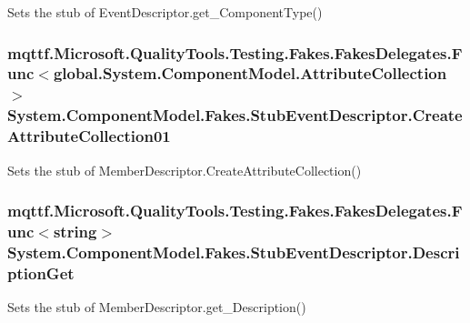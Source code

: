 Sets the stub of Event\-Descriptor.\-get\-\_\-\-Component\-Type()

\hypertarget{class_system_1_1_component_model_1_1_fakes_1_1_stub_event_descriptor_a0048f09bfeffd178c07e0e381c66b325}{
\subsubsection[{Create\-Attribute\-Collection01}]{\setlength{\rightskip}{0pt plus 5cm}mqttf.\-Microsoft.\-Quality\-Tools.\-Testing.\-Fakes.\-Fakes\-Delegates.\-Func$<$global.\-System.\-Component\-Model.\-Attribute\-Collection$>$ System.\-Component\-Model.\-Fakes.\-Stub\-Event\-Descriptor.\-Create\-Attribute\-Collection01}}\label{class_system_1_1_component_model_1_1_fakes_1_1_stub_event_descriptor_a0048f09bfeffd178c07e0e381c66b325}


Sets the stub of Member\-Descriptor.\-Create\-Attribute\-Collection()

\hypertarget{class_system_1_1_component_model_1_1_fakes_1_1_stub_event_descriptor_aacab6845a74225209702aa209a7959b9}{
\subsubsection[{Description\-Get}]{\setlength{\rightskip}{0pt plus 5cm}mqttf.\-Microsoft.\-Quality\-Tools.\-Testing.\-Fakes.\-Fakes\-Delegates.\-Func$<$string$>$ System.\-Component\-Model.\-Fakes.\-Stub\-Event\-Descriptor.\-Description\-Get}}\label{class_system_1_1_component_model_1_1_fakes_1_1_stub_event_descriptor_aacab6845a74225209702aa209a7959b9}


Sets the stub of Member\-Descriptor.\-get\-\_\-\-Description()

